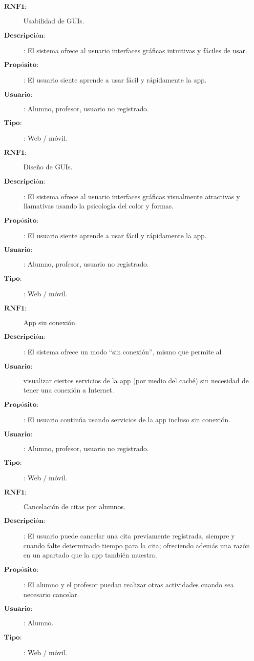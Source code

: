 \begin{description}
\item[$\textbf{RNF1:}$] Usabilidad de GUIs. 
\item[$\textbf{Descripción:}$]: El sistema ofrece al usuario interfaces gráficas intuitivas y fáciles de usar.
\item[$\textbf{Propósito:}$]: El usuario siente aprende a usar fácil y rápidamente la app.
\item[$\textbf{Usuario:}$]: Alumno, profesor, usuario no registrado.  
\item[$\textbf{Tipo:}$]: Web / móvil. \\

\item[$\textbf{RNF1:}$] Diseño de GUIs. 
\item[$\textbf{Descripción:}$]: El sistema ofrece al usuario interfaces gráficas visualmente atractivas y llamativas usando la psicología del color y formas.
\item[$\textbf{Propósito:}$]: El usuario siente aprende a usar fácil y rápidamente la app.
\item[$\textbf{Usuario:}$]: Alumno, profesor, usuario no registrado.  
\item[$\textbf{Tipo:}$]: Web / móvil. \\

\item[$\textbf{RNF1:}$] App sin conexión. 
\item[$\textbf{Descripción:}$]: El sistema ofrece un modo “sin conexión”, mismo que permite al \item[$\textbf{Usuario:}$] visualizar ciertos servicios de la app (por medio del caché) sin necesidad de tener una conexión a Internet.
\item[$\textbf{Propósito:}$]: El usuario continúa usando servicios de la app incluso sin conexión.
\item[$\textbf{Usuario:}$]: Alumno, profesor, usuario no registrado.  
\item[$\textbf{Tipo:}$]: Web / móvil.  \\

\item[$\textbf{RNF1:}$] Cancelación de citas por alumnos. 
\item[$\textbf{Descripción:}$]: El usuario puede cancelar una cita previamente registrada, siempre y cuando falte determinado tiempo para la cita; ofreciendo además una razón en un apartado que la app también muestra.
\item[$\textbf{Propósito:}$]: El alumno y el profesor puedan realizar otras actividades cuando sea necesario cancelar. 
\item[$\textbf{Usuario:}$]: Alumno.
\item[$\textbf{Tipo:}$]: Web / móvil. \\


\end{description}
